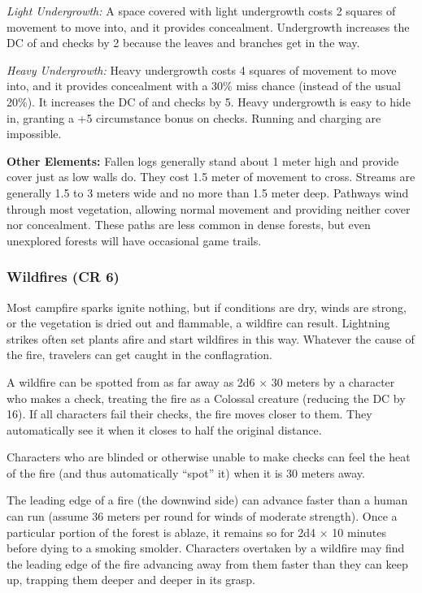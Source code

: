 \textit{Light Undergrowth:} A space covered with light undergrowth costs 2 squares of movement to move into, and it provides concealment. Undergrowth increases the DC of  and  checks by 2 because the leaves and branches get in the way.

\textit{Heavy Undergrowth:} Heavy undergrowth costs 4 squares of movement to move into, and it provides concealment with a 30\% miss chance (instead of the usual 20\%). It increases the DC of  and  checks by 5. Heavy undergrowth is easy to hide in, granting a +5 circumstance bonus on  checks. Running and charging are impossible.

\textbf{Other Elements:} Fallen logs generally stand about 1 meter high and provide cover just as low walls do. They cost 1.5 meter of movement to cross. Streams are generally 1.5 to 3 meters wide and no more than 1.5 meter deep. Pathways wind through most vegetation, allowing normal movement and providing neither cover nor concealment. These paths are less common in dense forests, but even unexplored forests will have occasional game trails.

\subsubsection{Wildfires (CR 6)}
Most campfire sparks ignite nothing, but if conditions are dry, winds are strong, or the vegetation is dried out and flammable, a wildfire can result. Lightning strikes often set plants afire and start wildfires in this way. Whatever the cause of the fire, travelers can get caught in the conflagration.

A wildfire can be spotted from as far away as 2d6 $\times$ 30 meters by a character who makes a  check, treating the fire as a Colossal creature (reducing the DC by 16). If all characters fail their  checks, the fire moves closer to them. They automatically see it when it closes to half the original distance.

Characters who are blinded or otherwise unable to make  checks can feel the heat of the fire (and thus automatically ``spot'' it) when it is 30 meters away.

The leading edge of a fire (the downwind side) can advance faster than a human can run (assume 36 meters per round for winds of moderate strength). Once a particular portion of the forest is ablaze, it remains so for 2d4 $\times$ 10 minutes before dying to a smoking smolder. Characters overtaken by a wildfire may find the leading edge of the fire advancing away from them faster than they can keep up, trapping them deeper and deeper in its grasp.

